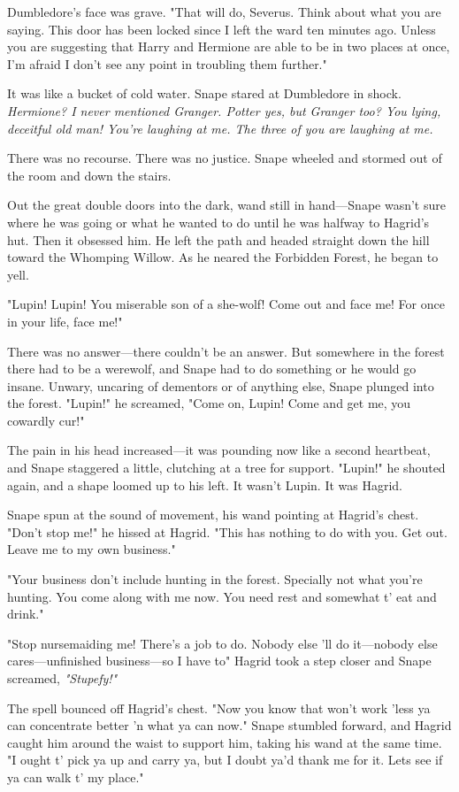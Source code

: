 Dumbledore's face was grave. "That will do, Severus. Think about what you are saying. This door has been locked since I left the ward ten minutes ago. Unless you are suggesting that Harry and Hermione are able to be in two places at once, I'm afraid I don't see any point in troubling them further."

It was like a bucket of cold water. Snape stared at Dumbledore in shock. \emph{Hermione? I never mentioned Granger. Potter yes, but Granger too? You lying, deceitful old man! You're laughing at me. The three of you are laughing at me.}

There was no recourse. There was no justice. Snape wheeled and stormed out of the room and down the stairs.

Out the great double doors into the dark, wand still in hand—Snape wasn't sure where he was going or what he wanted to do until he was halfway to Hagrid's hut. Then it obsessed him. He left the path and headed straight down the hill toward the Whomping Willow. As he neared the Forbidden Forest, he began to yell.

"Lupin! Lupin! You miserable son of a she-wolf! Come out and face me! For once in your life, face me!"

There was no answer—there couldn't be an answer. But somewhere in the forest there had to be a werewolf, and Snape had to do something or he would go insane. Unwary, uncaring of dementors or of anything else, Snape plunged into the forest. "Lupin!" he screamed, "Come on, Lupin! Come and get me, you cowardly cur!"

The pain in his head increased—it was pounding now like a second heartbeat, and Snape staggered a little, clutching at a tree for support. "Lupin!" he shouted again, and a shape loomed up to his left. It wasn't Lupin. It was Hagrid.

Snape spun at the sound of movement, his wand pointing at Hagrid's chest. "Don't stop me!" he hissed at Hagrid. "This has nothing to do with you. Get out. Leave me to my own business."

"Your business don't include hunting in the forest. Specially not what you're hunting. You come along with me now. You need rest and somewhat t' eat and drink."

"Stop nursemaiding me! There's a job to do. Nobody else 'll do it—nobody else cares—unfinished business—so I have to{\el}" Hagrid took a step closer and Snape screamed, \emph{"Stupefy!"}

The spell bounced off Hagrid's chest. "Now you know that won't work 'less ya can concentrate better 'n what ya can now." Snape stumbled forward, and Hagrid caught him around the waist to support him, taking his wand at the same time. "I ought t' pick ya up and carry ya, but I doubt ya'd thank me for it. Lets see if ya can walk t' my place."

